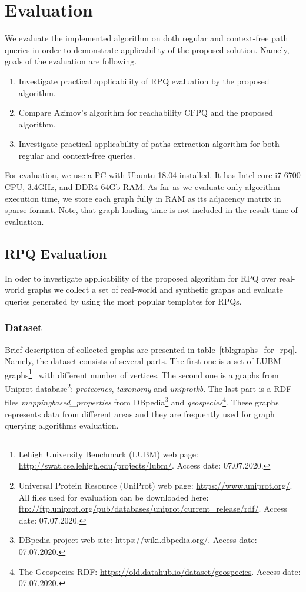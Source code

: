 \section{Evaluation}

We evaluate the implemented algorithm on doth regular and context-free path queries in order to demonstrate applicability of the proposed solution.
Namely, goals of the evaluation are following.
\begin{enumerate}
	\item Investigate practical applicability of RPQ evaluation by the proposed algorithm.
	\item Compare Azimov's algorithm for reachability CFPQ and the proposed algorithm.
	\item Investigate practical applicability of paths extraction algorithm for both regular and context-free queries.
\end{enumerate}

For evaluation, we use a PC with Ubuntu 18.04 installed.
It has Intel core i7-6700 CPU, 3.4GHz, and DDR4 64Gb RAM.
As far as we evaluate only algorithm execution time, we store each graph fully in RAM as its adjacency matrix in sparse format.
Note, that graph loading time is not included in the result time of evaluation.	

\subsection{RPQ Evaluation}

In oder to investigate applicability of the proposed algorithm for RPQ over real-world graphs we collect a set of real-world and synthetic graphs and evaluate queries generated by using the most popular templates for RPQs.

\subsubsection{Dataset}

Brief description of collected graphs are presented in table~\ref{tbl:graphs_for_rpq}.
Namely, the dataset consists of several parts.
The first one is a set of LUBM graphs\footnote{Lehigh University Benchmark (LUBM) web page: \url{http://swat.cse.lehigh.edu/projects/lubm/}. Access date: 07.07.2020.}~\cite{10.1016/j.websem.2005.06.005} with different number of vertices.
The second one is a graphs from Uniprot database\footnote{Universal Protein Resource (UniProt) web page: \url{https://www.uniprot.org/}. All files used for evaluation can be downloaded here: \url{ftp://ftp.uniprot.org/pub/databases/uniprot/current_release/rdf/}. Access date: 07.07.2020.}: \textit{proteomes}, \textit{taxonomy} and \textit{uniprotkb}.
The last part is a RDF files \textit{mappingbased\_properties} from DBpedia\footnote{DBpedia project web site: \url{https://wiki.dbpedia.org/}. Access date: 07.07.2020.} and \textit{geospecies}\footnote{The Geospecies RDF: \url{https://old.datahub.io/dataset/geospecies}. Access date: 07.07.2020.}.
These graphs represents data from different areas and they are frequently used for graph querying algorithms evaluation.

